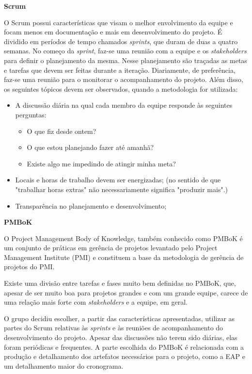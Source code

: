 
\textbf{Scrum}

O Scrum possui características que visam o melhor envolvimento da equipe e focam menos em documentação e mais em desenvolvimento do projeto. É dividido em períodos de tempo chamados \textit{sprints}, que duram de duas a quatro semanas. No começo da \textit{sprint}, faz-se uma reunião com a equipe e os \textit{stakeholders} para definir o planejamento da mesma. Nesse planejamento são traçadas as metas e tarefas que devem ser feitas durante a iteração. Diariamente, de preferência, faz-se uma reunião para o monitorar o acompanhamento do projeto. Além disso, os seguintes tópicos devem ser observados, quando a metodologia for utilizada: \cite{scrum2013}

\begin{itemize}
\item A discussão diária na qual cada membro da equipe responde às seguintes perguntas:
	\begin{itemize}
	\item O que fiz desde ontem?
	\item O que estou planejando fazer até amanhã?
	\item Existe algo me impedindo de atingir minha meta?
	\end{itemize}
\item Locais e horas de trabalho devem ser energizadas; (no sentido de que "trabalhar horas extras" não necessariamente significa "produzir mais".)
\item Transparência no planejamento e desenvolvimento;
\end{itemize}

\textbf{PMBoK}

O Project Management Body of Knowledge, também conhecido como PMBoK é um conjunto de práticas em gerência de projetos levantado pelo Project Management Institute (PMI) e constituem a base da metodologia de gerência de projetos do PMI.\cite{gomez2010}

Existe uma divisão entre tarefas e fases muito bem definidas no PMBoK, que, apesar de ser muito boa para projetos grandes e com um grande equipe, carece de uma relação mais forte com \textit{stakeholders} e a equipe, em geral.

O grupo decidiu escolher, a partir das características apresentadas, utilizar as partes do Scrum relativas às \textit{sprints} e às reuniões de acompanhamento do desenvolvimento do projeto. Apesar das discussões não terem sido diárias, elas foram periódicas e frequentes. A parte escolhida do PMBoK é relacionada com a produção e detalhamento dos artefatos necessários para o projeto, como a EAP e um detalhamento maior do cronograma.